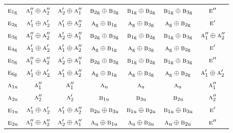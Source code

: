 \documentclass[10pt,a4paper]{article}
\numberwithin{equation}{section}
\newcommand{\irr}[1]{\text{\normalfont\scshape #1}}
\newcommand{\ptag}[1]{\mathrm{#1}}
\begin{document}
{\begin{longtable}{@{}lcccccc@{}}
$\irr{e}_{1\ptag{g}}$ & $\irr{a}_{1}''\oplus \irr{a}_{2}''$ & $\irr{a}_{2}'\oplus \irr{a}_{1}''$ & $\irr{b}_{2\ptag{g}}\oplus \irr{b}_{3\ptag{g}}$ & $\irr{b}_{1\ptag{g}}\oplus \irr{b}_{2\ptag{g}}$ & $\irr{b}_{1\ptag{g}}\oplus \irr{b}_{3\ptag{g}}$ & $\irr{e}''$\\
$\irr{e}_{2\ptag{g}}$ & $\irr{a}_{1}'\oplus \irr{a}_{2}'$ & $\irr{a}_{1}'\oplus \irr{a}_{2}''$ & $\irr{a}_{\ptag{g}}\oplus \irr{b}_{1\ptag{g}}$ & $\irr{a}_{\ptag{g}}\oplus \irr{b}_{3\ptag{g}}$ & $\irr{a}_{\ptag{g}}\oplus \irr{b}_{2\ptag{g}}$ & $\irr{e}'$\\
$\irr{e}_{3\ptag{g}}$ & $\irr{a}_{1}''\oplus \irr{a}_{2}''$ & $\irr{a}_{2}'\oplus \irr{a}_{1}''$ & $\irr{b}_{2\ptag{g}}\oplus \irr{b}_{3\ptag{g}}$ & $\irr{b}_{1\ptag{g}}\oplus \irr{b}_{2\ptag{g}}$ & $\irr{b}_{1\ptag{g}}\oplus \irr{b}_{3\ptag{g}}$ & $\irr{a}_{1}''\oplus \irr{a}_{2}''$\\
$\irr{e}_{4\ptag{g}}$ & $\irr{a}_{1}'\oplus \irr{a}_{2}'$ & $\irr{a}_{1}'\oplus \irr{a}_{2}''$ & $\irr{a}_{\ptag{g}}\oplus \irr{b}_{1\ptag{g}}$ & $\irr{a}_{\ptag{g}}\oplus \irr{b}_{3\ptag{g}}$ & $\irr{a}_{\ptag{g}}\oplus \irr{b}_{2\ptag{g}}$ & $\irr{e}'$\\
$\irr{e}_{5\ptag{g}}$ & $\irr{a}_{1}''\oplus \irr{a}_{2}''$ & $\irr{a}_{2}'\oplus \irr{a}_{1}''$ & $\irr{b}_{2\ptag{g}}\oplus \irr{b}_{3\ptag{g}}$ & $\irr{b}_{1\ptag{g}}\oplus \irr{b}_{2\ptag{g}}$ & $\irr{b}_{1\ptag{g}}\oplus \irr{b}_{3\ptag{g}}$ & $\irr{e}''$\\
$\irr{e}_{6\ptag{g}}$ & $\irr{a}_{1}'\oplus \irr{a}_{2}'$ & $\irr{a}_{1}'\oplus \irr{a}_{2}''$ & $\irr{a}_{\ptag{g}}\oplus \irr{b}_{1\ptag{g}}$ & $\irr{a}_{\ptag{g}}\oplus \irr{b}_{3\ptag{g}}$ & $\irr{a}_{\ptag{g}}\oplus \irr{b}_{2\ptag{g}}$ & $\irr{a}_{1}'\oplus \irr{a}_{2}'$\\
$\irr{a}_{1\ptag{u}}$ & $\irr{a}_{1}''$ & $\irr{a}_{1}''$ & $\irr{a}_{\ptag{u}}$ & $\irr{a}_{\ptag{u}}$ & $\irr{a}_{\ptag{u}}$ & $\irr{a}_{1}''$\\
$\irr{a}_{2\ptag{u}}$ & $\irr{a}_{2}''$ & $\irr{a}_{2}'$ & $\irr{b}_{1\ptag{u}}$ & $\irr{b}_{3\ptag{u}}$ & $\irr{b}_{2\ptag{u}}$ & $\irr{a}_{2}''$\\
$\irr{e}_{1\ptag{u}}$ & $\irr{a}_{1}'\oplus \irr{a}_{2}'$ & $\irr{a}_{1}'\oplus \irr{a}_{2}''$ & $\irr{b}_{2\ptag{u}}\oplus \irr{b}_{3\ptag{u}}$ & $\irr{b}_{1\ptag{u}}\oplus \irr{b}_{2\ptag{u}}$ & $\irr{b}_{1\ptag{u}}\oplus \irr{b}_{3\ptag{u}}$ & $\irr{e}'$\\
$\irr{e}_{2\ptag{u}}$ & $\irr{a}_{1}''\oplus \irr{a}_{2}''$ & $\irr{a}_{2}'\oplus \irr{a}_{1}''$ & $\irr{a}_{\ptag{u}}\oplus \irr{b}_{1\ptag{u}}$ & $\irr{a}_{\ptag{u}}\oplus \irr{b}_{3\ptag{u}}$ & $\irr{a}_{\ptag{u}}\oplus \irr{b}_{2\ptag{u}}$ & $\irr{e}''$\\

\end{longtable}}
\end{document}

